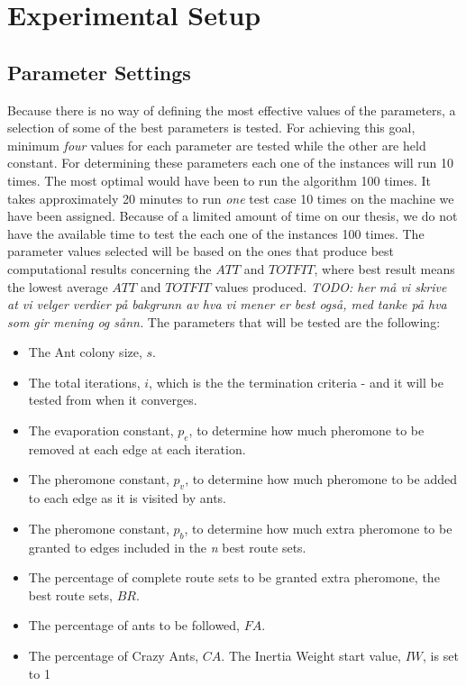 \section{Experimental Setup}

 
\subsection{Parameter Settings}
\label{subsec:parameterSettings_setup}

Because there is no way of defining the most effective values of the parameters, a selection of some of the best parameters is tested. For achieving this goal, minimum \textit{four} values for each parameter are tested while the other are held constant. For determining these parameters each one of the instances will run 10 times. The most optimal would have been to run the algorithm 100 times. It takes approximately 20 minutes to run \textit{one} test case 10 times on the machine we have been assigned. Because of a limited amount of time on our thesis, we do not have the available time to test the each one of the instances 100 times. The parameter values selected will be based on the ones that produce best computational results concerning the $ATT$ and $TOTFIT$, where best result means the lowest average $ATT$ and $TOTFIT$ values produced. \emph{\color{blue} TODO: her må vi skrive at vi velger verdier på bakgrunn av hva vi mener er best også, med tanke på hva som gir mening og sånn. }  The parameters that will be tested are the following:

\begin{itemize}
\item The Ant colony size, $s$.
\item The total iterations, $i$, which is the the termination criteria - and it will be tested from when it converges. 
\item The evaporation constant, $p_{e}$, to determine how much pheromone to be removed at each edge at each iteration. 
\item The pheromone constant, $p_{v}$, to determine how much pheromone to be added to each edge as it is visited by ants. 
\item The pheromone constant, $p_{b}$, to determine how much extra pheromone to be granted to edges included in the \textit{n} best route sets.
\item The percentage of complete route sets to be granted extra pheromone, the best route sets, $BR$.
\item The percentage of ants to be followed, $FA$.
\item The percentage of Crazy Ants, $CA$. The Inertia Weight start value, $IW$, is set to 1%
\end{itemize}

